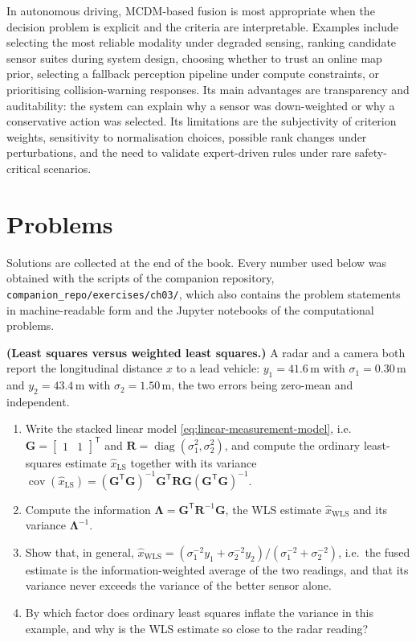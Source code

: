 \documentclass[graybox,envcountchap]{style/SNmono}
\DeclareMathOperator{\diag}{diag}
\newcommand{\problemsection}{\section*{Problems}\addcontentsline{toc}{section}{Problems}}
\newcommand{\repopath}[1]{\texttt{#1}}
\begin{document}
In autonomous driving, MCDM-based fusion is most appropriate when the decision problem is explicit and the criteria are interpretable. Examples include selecting the most reliable modality under degraded sensing, ranking candidate sensor suites during system design, choosing whether to trust an online map prior, selecting a fallback perception pipeline under compute constraints, or prioritising collision-warning responses. Its main advantages are transparency and auditability: the system can explain why a sensor was down-weighted or why a conservative action was selected. Its limitations are the subjectivity of criterion weights, sensitivity to normalisation choices, possible rank changes under perturbations, and the need to validate expert-driven rules under rare safety-critical scenarios.

\problemsection
Solutions are collected at the end of the book. Every number used below was obtained with the scripts of the companion repository, \repopath{companion\_\allowbreak repo/\allowbreak exercises/\allowbreak ch03/\allowbreak }, which also contains the problem statements in machine-readable form and the Jupyter notebooks of the computational problems.

\begin{prob}\label{prob:ch03:1}
\textbf{(Least squares versus weighted least squares.)} A radar and a camera both report the longitudinal distance $x$ to a lead vehicle: $y_1=41.6$\,m with $\sigma_1=0.30$\,m and $y_2=43.4$\,m with $\sigma_2=1.50$\,m, the two errors being zero-mean and independent.
\begin{enumerate}
\item[(a)] Write the stacked linear model \eqref{eq:linear-measurement-model}, i.e.\ $\mathbf{G}=\begin{bmatrix}1&1\end{bmatrix}^{\mathsf T}$ and $\mathbf{R}=\diag(\sigma_1^{2},\sigma_2^{2})$, and compute the ordinary least-squares estimate $\widehat{x}_{\mathrm{LS}}$ together with its variance $\operatorname{cov}(\widehat{x}_{\mathrm{LS}})=(\mathbf{G}^{\mathsf T}\mathbf{G})^{-1}\mathbf{G}^{\mathsf T}\mathbf{R}\mathbf{G}(\mathbf{G}^{\mathsf T}\mathbf{G})^{-1}$.
\item[(b)] Compute the information $\mathbf{\Lambda}=\mathbf{G}^{\mathsf T}\mathbf{R}^{-1}\mathbf{G}$, the WLS estimate $\widehat{x}_{\mathrm{WLS}}$ and its variance $\mathbf{\Lambda}^{-1}$.
\item[(c)] Show that, in general, $\widehat{x}_{\mathrm{WLS}}=(\sigma_1^{-2}y_1+\sigma_2^{-2}y_2)/(\sigma_1^{-2}+\sigma_2^{-2})$, i.e.\ the fused estimate is the information-weighted average of the two readings, and that its variance never exceeds the variance of the better sensor alone.
\item[(d)] By which factor does ordinary least squares inflate the variance in this example, and why is the WLS estimate so close to the radar reading?
\end{enumerate}
\end{prob}
\end{document}
